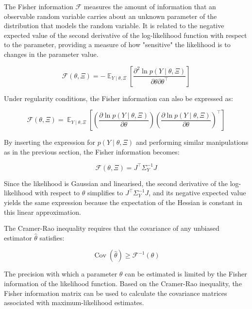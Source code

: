 \documentclass[a4paper,fleqn]{cas-dc}
\begin{document}
		The Fisher information $\mathcal{F}$ measures the amount of information that an observable random variable carries about an unknown parameter of the distribution that models the random variable. It is related to the negative expected value of the second derivative of the log-likelihood function with respect to the parameter, providing a measure of how "sensitive" the likelihood is to changes in the parameter value.
		
		{\footnotesize \begin{equation} \mathcal{F}(\theta, \Xi) = -\mathop{\mathbb{E}}_{Y \mid \theta, \Xi} \left[ \frac{\partial^2 \ln p \left( Y \mid \theta, \Xi \right)}{\partial \theta \partial \theta^\top} \right] \end{equation} }
		
		Under regularity conditions, the Fisher information can also be expressed as:
		
		{\footnotesize \begin{equation} \mathcal{F}(\theta, \Xi) = \mathop{\mathbb{E}}_{Y \mid \theta, \Xi} \left[ \left( \frac{\partial \ln p\left( Y \mid \theta, \Xi \right)}{\partial \theta} \right) \left( \frac{\partial \ln p\left( Y \mid \theta, \Xi \right)}{\partial \theta} \right)^\top \right] \end{equation} }
		
		By inserting the expression for $p\left( Y \mid \theta, \Xi \right)$ and performing similar manipulations as in the previous section, the Fisher information becomes:
		
		{\footnotesize \begin{equation} \mathcal{F}(\theta, \Xi) = J^\top \Sigma_Y^{-1} J \end{equation} }
		
		Since the likelihood is Gaussian and linearised, the second derivative of the log-likelihood with respect to $\theta$ simplifies to $J^\top \Sigma_Y^{-1} J$, and its negative expected value yields the same expression because the expectation of the Hessian is constant in this linear approximation.
		
		The Cramer-Rao inequality requires that the covariance of any unbiased estimator $\hat{\theta}$ satisfies:
		
		{\footnotesize \begin{equation} \operatorname{Cov}(\hat{\theta}) \geq \mathcal{F}^{-1}(\theta) \end{equation} }
		
		The precision with which a parameter $\theta$ can be estimated is limited by the Fisher information of the likelihood function. Based on the Cramer-Rao inequality, the Fisher information matrix can be used to calculate the covariance matrices associated with maximum-likelihood estimates.
		
\end{document}
